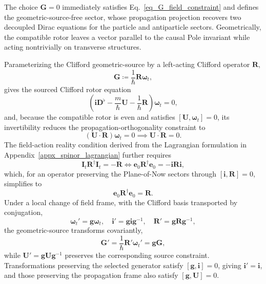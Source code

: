 The choice $\mathbf{G} = 0$ immediately satisfies Eq.~\eqref{eq_G_field_constraint} and defines the geometric-source-free sector, whose propagation projection recovers two decoupled Dirac equations for the particle and antiparticle sectors. Geometrically, the compatible rotor leaves a vector parallel to the causal Pole invariant while acting nontrivially on transverse structures.

Parameterizing the Clifford geometric-source by a left-acting Clifford operator $\mathbf{R}$,
\begin{equation}\label{eq_G_R_definition}
    \mathbf{G} \coloneqq \frac{1}{\hbar}\mathbf{R}\boldsymbol{\omega}_{t},
\end{equation}
gives the sourced Clifford rotor equation
\begin{equation}\label{eq_clifford_rotor}
    \left(\mathbf{i}\mathbf{D}^{\flat} - \frac{m}{\hbar}\mathbf{U} - \frac{1}{\hbar}\mathbf{R}\right)\boldsymbol{\omega}_{t} = 0,
\end{equation}
and, because the compatible rotor is even and satisfies $[\mathbf{U},\boldsymbol{\omega}_{t}]=0$, its invertibility reduces the propagation-orthogonality constraint to
\begin{equation}\label{eq_R_field_constraint}
    \left(\mathbf{U}\cdot\mathbf{R}\right)\boldsymbol{\omega}_{t} = 0 \implies \mathbf{U}\cdot\mathbf{R} = 0.
\end{equation}
The field-action reality condition derived from the Lagrangian formulation in Appendix~\ref{appx_spinor_lagrangian} further requires
\begin{equation}
    \mathbf{I}_{t}\mathbf{R}^{\dagger}\mathbf{I}_{t} = -\mathbf{R} \iff \mathbf{e}_{0}\mathbf{R}^{\dagger}\mathbf{e}_{0} = -\mathbf{i}\mathbf{R}\mathbf{i},
\end{equation}
which, for an operator preserving the Plane-of-Now sectors through $[\mathbf{i}, \mathbf{R}] = 0$, simplifies to
\begin{equation}
    \mathbf{e}_{0}\mathbf{R}^{\dagger}\mathbf{e}_{0} = \mathbf{R}.
\end{equation}
Under a local change of field frame, with the Clifford basis transported by conjugation,
\begin{equation}
    \boldsymbol{\omega}_{t}' = \mathbf{g}\boldsymbol{\omega}_{t},\quad \mathbf{i}' = \mathbf{g}\mathbf{i}\mathbf{g}^{-1},\quad \mathbf{R}' = \mathbf{g}\mathbf{R}\mathbf{g}^{-1},
\end{equation}
the geometric-source transforms covariantly,
\begin{equation}
    \mathbf{G}' = \frac{1}{\hbar}\mathbf{R}'\boldsymbol{\omega}_{t}' = \mathbf{g}\mathbf{G},
\end{equation}
while $\mathbf{U}'=\mathbf{g}\mathbf{U}\mathbf{g}^{-1}$ preserves the corresponding source constraint. Transformations preserving the selected generator satisfy $[\mathbf{g},\mathbf{i}]=0$, giving $\mathbf{i}'=\mathbf{i}$, and those preserving the propagation frame also satisfy $[\mathbf{g},\mathbf{U}]=0$.


